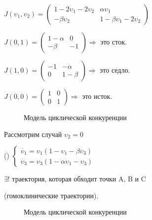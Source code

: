 \vspace{0.5cm}
\(
J(\upsilon_1,\upsilon_2) = 
 \begin{pmatrix}
 1-2\upsilon_1-2\upsilon_2 & \alpha\upsilon_1\\
 -\beta\upsilon_2 & 1-\beta\upsilon_1 - 2\upsilon_2
 \end{pmatrix}
\)

\vspace{0.5cm}

\(
 J(0,1) = 
 \begin{pmatrix}
 1-\alpha & 0 \\ 
 -\beta & -1
 \end{pmatrix}
\)\hspace{0.5cm}\(\Rightarrow\) это сток.

\vspace{0.5cm}
\(
 J(1,0) = 
 \begin{pmatrix}
 -1 & -\alpha \\ 
 0 & 1 - \beta
 \end{pmatrix}
\)\hspace{0.5cm}\(\Rightarrow\) это седло.

\vspace{0.5cm}
\(
 J(0,0) = 
 \begin{pmatrix}
 1 & 0\\
 0 & 1
 \end{pmatrix}
\)\hspace{0.5cm}\(\Rightarrow\) это исток.
\begin{figure} [h!]
			\caption{Модель циклической конкуренции}	
\end{figure}

\newpage
Рассмотрим случай { \underline{\(\upsilon_2 = 0\)}}

\vspace{0.5cm}
({})
\(
 \begin{cases}
 	\dot{\upsilon_1} = \upsilon_1(1-\upsilon_1 - \beta\upsilon_3)
 	\\
 	\dot{\upsilon_3} = \upsilon_3(1-\alpha\upsilon_1 - \upsilon_3)
 \end{cases}
\)

\vspace{0.5cm}
\(\exists!\) траектория, которая обходит точки  A, B и C

(гомоклинические траектории).
\begin{figure} [h!]
			\caption{Модель циклической конкуренции}	
\end{figure}

